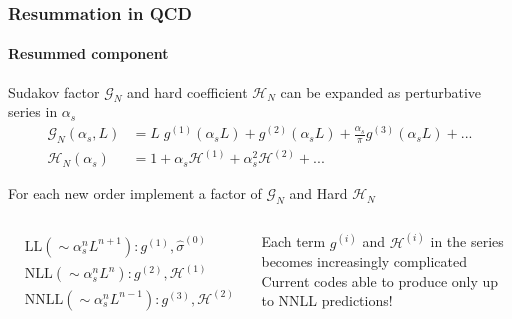 \documentclass[aspectratio=43]{beamer}
\begin{document}
\begin{frame}
	
	\frametitle{Resummation in QCD}
	\framesubtitle{Resummed component}
	
	\footnotesize
	
	Sudakov factor $\mathcal{G}_{N}$ and hard coefficient $\mathcal{H}_{N}$ can be expanded as perturbative series in $\alpha_{s}$
	\begin{align}
	\mathcal{G}_{N}(\alpha_{s}, L) &= L\;g^{(1)}(\alpha_{s}L) + g^{(2)}(\alpha_{s}L) + \frac{\alpha_{s}}{\pi}g^{(3)}(\alpha_{s}L) + ... \nonumber \\
	\mathcal{H}_{N}(\alpha_{s}) &= 1 + \alpha_{s}\mathcal{H}^{(1)} + \alpha_{s}^{2}\mathcal{H}^{(2)} + ...  \nonumber
	\end{align}
	
	For each new order implement a factor of $\mathcal{G}_{N}$ and Hard $\mathcal{H}_{N}$
	
	\begin{columns}
		
		
		\begin{align}
		&\textrm{LL} (\sim \alpha_{s}^{n}L^{n+1}): g^{(1)}, \hat{\sigma}^{(0)} \nonumber \\
		&\textrm{NLL} (\sim \alpha_{s}^{n}L^{n}): g^{(2)}, \mathcal{H}^{(1)} \nonumber \\
		&\textrm{NNLL} (\sim \alpha_{s}^{n}L^{n-1}): g^{(3)}, \mathcal{H}^{(2)} \nonumber
		\end{align}
		
		
		Each term $g^{(i)}$ and $\mathcal{H}^{(i)}$ in the series becomes increasingly complicated \\
		\vspace{0.25 cm}
		Current codes able to produce only up to NNLL predictions!
		
	\end{columns}

\end{frame}

%
%

\begin{frame}


\end{frame}
\end{document}
